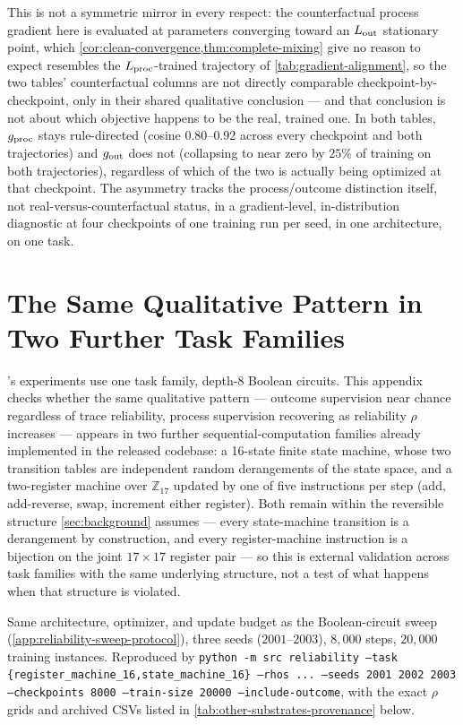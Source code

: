 This is not a symmetric mirror in every respect: the counterfactual
process gradient here is evaluated at parameters converging toward an
$L_{\rm out}$ stationary point, which \cref{cor:clean-convergence,thm:complete-mixing}
give no reason to expect resembles the $L_{\rm proc}$-trained trajectory
of \cref{tab:gradient-alignment}, so the two tables' counterfactual
columns are not directly comparable checkpoint-by-checkpoint, only in
their shared qualitative conclusion --- and that conclusion is not
about which objective happens to be the real, trained one. In both
tables, $g_{\rm proc}$ stays rule-directed (cosine $0.80$--$0.92$ across
every checkpoint and both trajectories) and $g_{\rm out}$ does not
(collapsing to near zero by $25\%$ of training on both trajectories),
regardless of which of the two is actually being optimized at that
checkpoint. The asymmetry tracks the process/outcome distinction itself,
not real-versus-counterfactual status, in a gradient-level, in-distribution
diagnostic at four checkpoints of one training run per seed, in one
architecture, on one task.

\section{The Same Qualitative Pattern in Two Further Task Families}
\label{app:other-substrates}

's experiments use one task
family, depth-8 Boolean circuits. This appendix checks whether the same
qualitative pattern --- outcome supervision near chance regardless of
trace reliability, process supervision recovering as reliability $\rho$
increases --- appears in two further sequential-computation families
already implemented in the released codebase: a 16-state finite state
machine, whose two transition tables are independent random derangements
of the state space, and a two-register machine over $\mathbb{Z}_{17}$
updated by one of five instructions per step (add, add-reverse, swap,
increment either register). Both remain within the reversible structure
\cref{sec:background} assumes --- every state-machine transition is a
derangement by construction, and every register-machine instruction is a
bijection on the joint $17\times17$ register pair --- so this is external
validation across task families with the same underlying structure, not a
test of what happens when that structure is violated.

Same architecture, optimizer, and update budget as the Boolean-circuit
sweep (\cref{app:reliability-sweep-protocol}), three seeds ($2001$--$2003$),
$8{,}000$ steps, $20{,}000$ training instances. Reproduced by
\texttt{python -m src reliability --task \{register\_machine\_16,state\_machine\_16\}
--rhos ... --seeds 2001 2002 2003 --checkpoints 8000 --train-size 20000
--include-outcome}, with the exact $\rho$ grids and archived CSVs listed
in \cref{tab:other-substrates-provenance} below.

